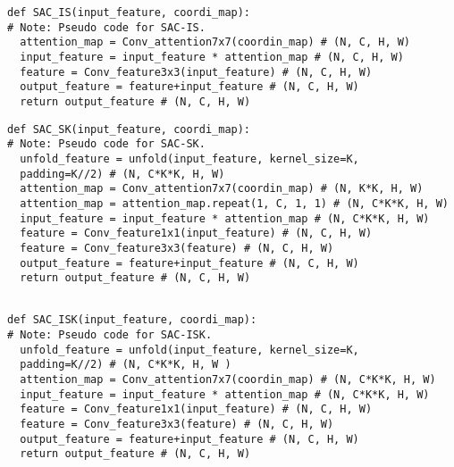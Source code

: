 \documentclass[runningheads]{llncs}
\begin{document}
    

\begin{verbatim}
def SAC_IS(input_feature, coordi_map):
# Note: Pseudo code for SAC-IS.
  attention_map = Conv_attention7x7(coordin_map) # (N, C, H, W)
  input_feature = input_feature * attention_map # (N, C, H, W)
  feature = Conv_feature3x3(input_feature) # (N, C, H, W)
  output_feature = feature+input_feature # (N, C, H, W)
  return output_feature # (N, C, H, W)
\end{verbatim}

\begin{verbatim}
def SAC_SK(input_feature, coordi_map):
# Note: Pseudo code for SAC-SK.
  unfold_feature = unfold(input_feature, kernel_size=K, 
  padding=K//2) # (N, C*K*K, H, W)
  attention_map = Conv_attention7x7(coordin_map) # (N, K*K, H, W)
  attention_map = attention_map.repeat(1, C, 1, 1) # (N, C*K*K, H, W)
  input_feature = input_feature * attention_map # (N, C*K*K, H, W)
  feature = Conv_feature1x1(input_feature) # (N, C, H, W)
  feature = Conv_feature3x3(feature) # (N, C, H, W)
  output_feature = feature+input_feature # (N, C, H, W)
  return output_feature # (N, C, H, W)
    
\end{verbatim}


\begin{verbatim}
def SAC_ISK(input_feature, coordi_map):
# Note: Pseudo code for SAC-ISK.
  unfold_feature = unfold(input_feature, kernel_size=K, 
  padding=K//2) # (N, C*K*K, H, W )
  attention_map = Conv_attention7x7(coordin_map) # (N, C*K*K, H, W)
  input_feature = input_feature * attention_map # (N, C*K*K, H, W)
  feature = Conv_feature1x1(input_feature) # (N, C, H, W)
  feature = Conv_feature3x3(feature) # (N, C, H, W)
  output_feature = feature+input_feature # (N, C, H, W)
  return output_feature # (N, C, H, W)
\end{verbatim}
\end{document}
